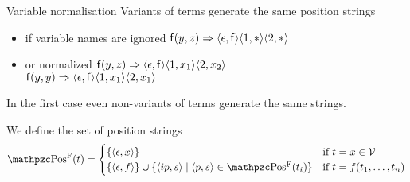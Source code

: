\begin{example}{Variable normalisation}
	Variants of terms generate the same position strings
	\begin{itemize}
		\item if variable names are ignored 
		\hfill${\mathsf f}(y,z) \Rightarrow
		\langle\epsilon,{\mathsf f}\rangle
		\langle1,*\rangle
		\langle2,*\rangle
		$
		
		\item or normalized 
		\hfill${\mathsf f}(y,z) \Rightarrow
		\langle\epsilon,{\mathsf f}\rangle
		\langle1,x_1\rangle
		\langle2,x_2\rangle$
		\\
		\hfill${\mathsf f}(y,y) \Rightarrow
		\langle\epsilon,{\mathsf f}\rangle
		\langle1,x_1\rangle
		\langle2,x_1\rangle
		$
	\end{itemize}
	
	In the first case even non-variants of terms generate the same strings.
\end{example}


\begin{definition} We define the set of {\myem position strings}
	\begin{gather*}
	\posS(t) =  
	\begin{cases}
	\{ \ANGLES{\epsilon,x} \} 
	& \text{if }t=x\in\SIGV \\
	\{ \ANGLES{\epsilon, f} \} \cup \{ \ANGLES{ip,s}\mid \ANGLES{p,s} \in\posS(t_i)\} 
	&\text{if }t=f(t_1,\ldots,t_n)
	\end{cases}
	\end{gather*}
\end{definition}


